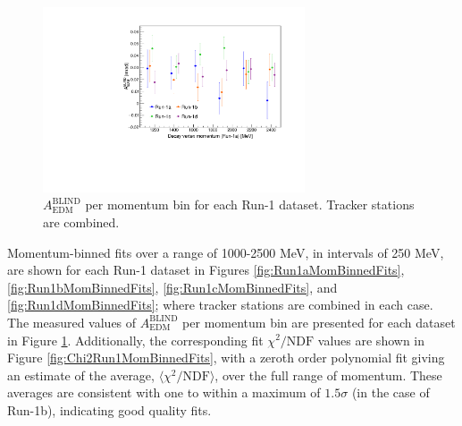 \begin{figure}[b!]
\centering{}
\includegraphics[trim={0 0 0 0},clip,width=0.69\textwidth]{Images/Chapter6/S12S18_AEDM_vs_p_overlay_1000_2500.pdf}
\caption{$A_{\text{EDM}}^{\text{BLIND}}$ per momentum bin for each Run-1 dataset. Tracker stations are combined.}
\label{fig:Run1AEDM}
\end{figure} 

Momentum-binned fits over a range of 1000-2500 MeV, in intervals of 250 MeV, are shown for each Run-1 dataset in Figures \ref{fig:Run1aMomBinnedFits}, \ref{fig:Run1bMomBinnedFits}, \ref{fig:Run1cMomBinnedFits}, and \ref{fig:Run1dMomBinnedFits}; where tracker stations are combined in each case. The measured values of $A_{\text{EDM}}^{\text{BLIND}}$ per momentum bin are presented for each dataset in Figure \ref{fig:Run1AEDM}. Additionally, the corresponding fit $\chi^{2}/\text{NDF}$ values are shown in Figure \ref{fig:Chi2Run1MomBinnedFits}, with a zeroth order polynomial fit giving an estimate of the average, $\langle \chi^{2}/\text{NDF} \rangle$, over the full range of momentum. These averages are consistent with one to within a maximum of $1.5\sigma$ (in the case of Run-1b), indicating good quality fits. 

